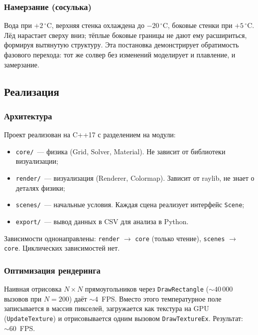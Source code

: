 \subsubsection{Намерзание (сосулька)}

Вода при $+2\,^{\circ}$C, верхняя стенка охлаждена до $-20\,^{\circ}$C,
боковые стенки при $+5\,^{\circ}$C. Лёд нарастает сверху вниз; тёплые
боковые границы не дают ему расшириться, формируя вытянутую структуру.
Эта постановка демонстрирует обратимость фазового перехода: тот же
солвер без изменений моделирует и плавление, и замерзание.

\subsection{Реализация}

\subsubsection{Архитектура}

Проект реализован на C++17 с разделением на модули:
\begin{itemize}
  \item \texttt{core/}~--- физика (Grid, Solver, Material). Не зависит от
        библиотеки визуализации;
  \item \texttt{render/}~--- визуализация (Renderer, Colormap). Зависит
        от raylib, не знает о деталях физики;
  \item \texttt{scenes/}~--- начальные условия. Каждая сцена реализует
        интерфейс \texttt{Scene};
  \item \texttt{export/}~--- вывод данных в CSV для анализа в Python.
\end{itemize}

Зависимости однонаправлены: \texttt{render} $\to$ \texttt{core} (только чтение),
\texttt{scenes} $\to$ \texttt{core}. Циклических зависимостей нет.

\subsubsection{Оптимизация рендеринга}

Наивная отрисовка $N \times N$ прямоугольников через \texttt{DrawRectangle}
($\sim 40\,000$ вызовов при $N = 200$) даёт $\sim 4$~FPS. Вместо этого
температурное поле записывается в массив пикселей, загружается как текстура
на GPU (\texttt{UpdateTexture}) и отрисовывается одним вызовом
\texttt{DrawTextureEx}. Результат: $\sim 60$~FPS.

